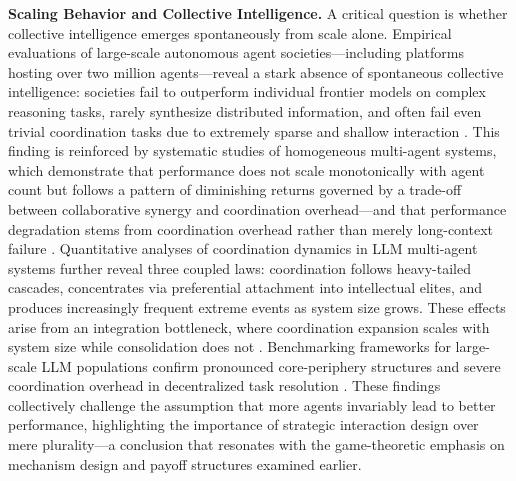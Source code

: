 \documentclass[11pt]{article}
\begin{document}
\textbf{Scaling Behavior and Collective Intelligence.} A critical question is whether collective intelligence emerges spontaneously from scale alone. Empirical evaluations of large-scale autonomous agent societies---including platforms hosting over two million agents---reveal a stark absence of spontaneous collective intelligence: societies fail to outperform individual frontier models on complex reasoning tasks, rarely synthesize distributed information, and often fail even trivial coordination tasks due to extremely sparse and shallow interaction \cite{ref248}. This finding is reinforced by systematic studies of homogeneous multi-agent systems, which demonstrate that performance does not scale monotonically with agent count but follows a pattern of diminishing returns governed by a trade-off between collaborative synergy and coordination overhead---and that performance degradation stems from coordination overhead rather than merely long-context failure \cite{ref28}. Quantitative analyses of coordination dynamics in LLM multi-agent systems further reveal three coupled laws: coordination follows heavy-tailed cascades, concentrates via preferential attachment into intellectual elites, and produces increasingly frequent extreme events as system size grows. These effects arise from an integration bottleneck, where coordination expansion scales with system size while consolidation does not \cite{ref249}. Benchmarking frameworks for large-scale LLM populations confirm pronounced core-periphery structures and severe coordination overhead in decentralized task resolution \cite{ref45}. These findings collectively challenge the assumption that more agents invariably lead to better performance, highlighting the importance of strategic interaction design over mere plurality---a conclusion that resonates with the game-theoretic emphasis on mechanism design and payoff structures examined earlier.
\end{document}

